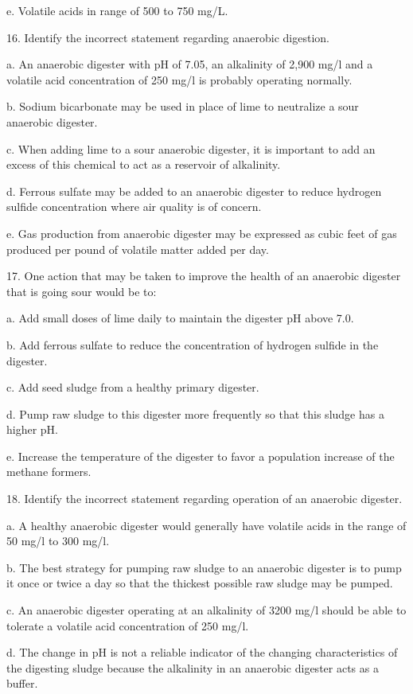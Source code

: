\documentclass{article}
\begin{document}
e. Volatile acids in range of 500 to 750 mg/L. 


16. Identify the incorrect statement regarding anaerobic digestion.

a. An anaerobic digester with pH of 7.05, an alkalinity of 2,900 mg/l and a volatile acid concentration of 250 mg/l is probably operating normally. 

b. Sodium bicarbonate may be used in place of lime to neutralize a sour anaerobic digester. 

c. When adding lime to a sour anaerobic digester, it is important to add an excess of this chemical to act as a reservoir of alkalinity. 

d. Ferrous sulfate may be added to an anaerobic digester to reduce hydrogen sulfide concentration where air quality is of concern. 

e. Gas production from anaerobic digester may be expressed as cubic feet of gas produced per pound of volatile matter added per day. 


17. One action that may be taken to improve the health of an anaerobic digester that is going sour would be to:

a. Add small doses of lime daily to maintain the digester pH above 7.0. 

b. Add ferrous sulfate to reduce the concentration of hydrogen sulfide in the digester. 

c. Add seed sludge from a healthy primary digester. 

d. Pump raw sludge to this digester more frequently so that this sludge has a higher pH. 

e. Increase the temperature of the digester to favor a population increase of the methane formers. 


18. Identify the incorrect statement regarding operation of an anaerobic digester.

a. A healthy anaerobic digester would generally have volatile acids in the range of 50 mg/l to 300 mg/l. 

b. The best strategy for pumping raw sludge to an anaerobic digester is to pump it once or twice a day so that the thickest possible raw sludge may be pumped. 

c. An anaerobic digester operating at an alkalinity of 3200 mg/l should be able to tolerate a volatile acid concentration of 250 mg/l. 

d. The change in pH is not a reliable indicator of the changing characteristics of the digesting sludge because the alkalinity in an anaerobic digester acts as a buffer. 
\end{document}
